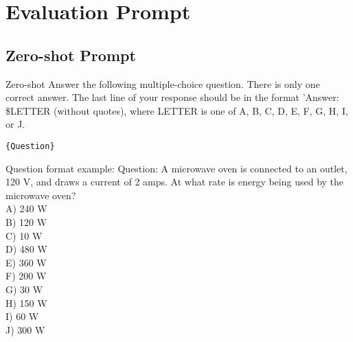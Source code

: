 

\section{Evaluation Prompt}
\label{appendix:Evaluation Prompt}
\subsection{Zero-shot Prompt}


\begin{promptbox}{Zero-shot}
Answer the following multiple-choice question. There is only one correct answer. The last line of
your response should be in the format ’Answer: \$LETTER (without quotes), where LETTER is
one of A, B, C, D, E, F, G, H, I, or J.
\begin{verbatim}
{Question}
\end{verbatim}
\end{promptbox}

\begin{promptbox}{Question format example:}
Question: A microwave oven is connected to an outlet, 120 V, and draws a current of 2 amps. At what rate is energy being used by the microwave oven? 
\\
A) 240 W\\
B) 120 W\\
C) 10 W\\
D) 480 W\\
E) 360 W\\
F) 200 W\\
G) 30 W\\
H) 150 W\\
I) 60 W\\
J) 300 W\\
\end{promptbox}

